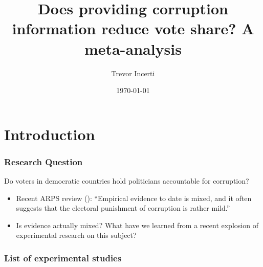 \documentclass[usenames,dvipsnames]{beamer}
\title{Does providing corruption information reduce vote share? A meta-analysis}
\date{\today}
\author{Trevor Incerti}
\institute{Yale University}
\begin{document}
\maketitle


\section{Introduction}

\begin{frame}
\frametitle{Research Question}
Do voters in democratic countries hold politicians accountable for corruption?
\pause
\begin{itemize}
\item Recent ARPS review (\citet{de2017electoral}): ``Empirical evidence to date is \textcolor{Cerulean}{mixed}, and it often suggests that the electoral punishment of corruption is rather mild.'' 
\pause
\item Is evidence actually mixed? What have we learned from a recent explosion of experimental research on this subject?
\end{itemize}
\end{frame}


\begin{frame}
\frametitle{List of experimental studies}


\begin{table}[!htbp] \centering 
  \caption{Field experiments}
  \label{tab:field} 
  \small
{}
\end{table} 


\end{frame}
\end{document}
